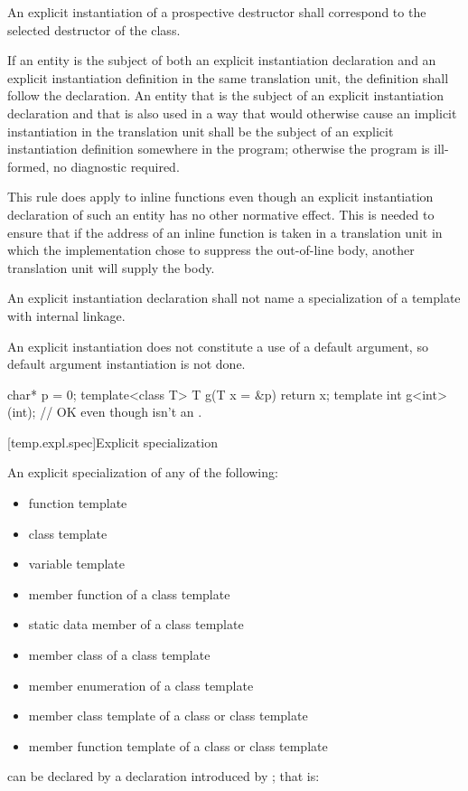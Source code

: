 \pnum
An explicit instantiation of a prospective destructor
shall correspond to the selected destructor of the class.

\pnum
If an entity is the subject of both an explicit instantiation declaration
and an explicit instantiation definition in the same translation unit, the
definition shall follow the declaration. An entity that is the subject of an
explicit instantiation declaration and that is also used
in a way that would otherwise cause an implicit instantiation
in the translation unit
shall be the subject of an explicit instantiation definition somewhere in the
program; otherwise the program is ill-formed, no diagnostic required.
\begin{note}
This rule does apply to inline functions even though an
explicit instantiation declaration of such an entity has no other normative
effect. This is needed to ensure that if the address of an inline function is
taken in a translation unit in which the implementation chose to suppress the
out-of-line body, another translation unit will supply the body.
\end{note}
An explicit instantiation declaration shall not name a specialization of a
template with internal linkage.

\pnum
An explicit instantiation does not constitute a use of a default argument,
so default argument instantiation is not done.
\begin{example}
\begin{codeblock}
char* p = 0;
template<class T> T g(T x = &p) { return x; }
template int g<int>(int);       // OK even though  isn't an .
\end{codeblock}
\end{example}

[temp.expl.spec]{Explicit specialization}

\pnum
{}%
An explicit specialization of any of the following:
\begin{itemize}
\item
function template
\item
class template
\item
variable template
\item
member function of a class template
\item
static data member of a class template
\item
member class of a class template
\item
member enumeration of a class template
\item
member class template of a class or class template
\item
member function template of a class or class template
\end{itemize}
can be declared by a declaration introduced by
;
that is:
%

